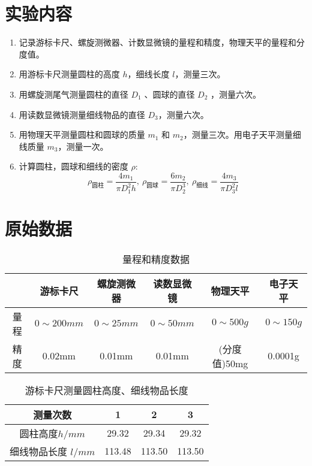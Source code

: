 \documentclass[UTF8]{ctexart}
\title{}
\author{}
\date{}
\begin{document}
\begin{titlepage}		
	
\end{titlepage}


\section{实验内容}
\begin{enumerate}
    \item 记录游标卡尺、螺旋测微器、计数显微镜的量程和精度，物理天平的量程和分度值。
    \item 用游标卡尺测量圆柱的高度 $h$，细线长度 $l$，测量三次。
    \item 用螺旋测尾气测量圆柱的直径 $D_1$ 、圆球的直径 $D_2$ ，测量六次。
    \item 用读数显微镜测量细线物品的直径 $D_3$，测量六次。
    \item 用物理天平测量圆柱和圆球的质量 $m_1$ 和 $m_2$，测量三次。用电子天平测量细线质量 $m_3$，测量一次。
    \item 计算圆柱，圆球和细线的密度 $\rho$:
    $$\rho_{\text{圆柱}} = \frac{4m_1}{\pi D_1^2 h},\  \rho_{\text{圆球}} = \frac{6m_2}{\pi D_2^3},\  \rho_{\text{细线}} = \frac{4m_3}{\pi D_3^2l}$$
\end{enumerate}

\section{原始数据}
\begin{table}[H]
\centering
\caption{量程和精度数据}
\begin{tabular}{|c|c|c|c|c|c|}
\hline
     & 游标卡尺 & 螺旋测微器 & 读数显微镜  & 物理天平  & 电子天平 \\
\hline
     量程 &  $0\sim 200mm$ & $0 \sim 25mm$ & $0 \sim 50mm$  & $0 \sim 500g$ & $0 \sim 150g$ \\
\hline 
    精度  & 0.02mm &  0.01mm & 0.01mm & (分度值)50mg  & 0.0001g\\
\hline
\end{tabular}
\end{table}

\begin{table}[H]
\centering
\caption{游标卡尺测量圆柱高度、细线物品长度}
\begin{tabular}{|c|c|c|c|}
\hline
     测量次数 & 1 & 2 & 3  \\
\hline
     圆柱高度$h/mm$ & 29.32 & 29.34 & 29.32 \\ 
\hline
     细线物品长度 $l/mm$ & 113.48 & 113.50 & 113.50\\ 
\hline
\end{tabular}
\end{table}
\end{document}
